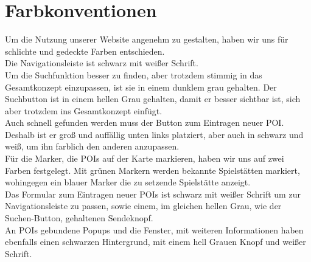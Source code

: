 \chapter{Farbkonventionen}
Um die Nutzung unserer Website angenehm zu gestalten, haben wir uns für schlichte und gedeckte Farben entschieden. \\
Die Navigationsleiste ist schwarz mit weißer Schrift. \\ Um die Suchfunktion besser zu finden, aber trotzdem stimmig in das Gesamtkonzept einzupassen, ist sie in einem dunklem grau gehalten. Der Suchbutton ist in einem hellen Grau gehalten, damit er besser sichtbar ist, sich aber trotzdem ins Gesamtkonzept einfügt.\\
Auch schnell gefunden werden muss der Button zum Eintragen neuer POI. Deshalb ist er groß und auffällig unten links platziert, aber auch in schwarz und weiß, um ihn farblich den anderen anzupassen. \\
Für die Marker, die POIs auf der Karte markieren, haben wir uns auf zwei Farben festgelegt. Mit grünen Markern werden bekannte Spielstätten markiert, wohingegen ein blauer Marker die zu setzende Spielstätte anzeigt. \\
Das Formular zum Eintragen neuer POIs ist schwarz mit weißer Schrift um zur Navigationsleiste zu passen, sowie einem, im gleichen hellen Grau, wie der \glqq Suchen\grqq-Button, gehaltenen Sendeknopf.\\
An POIs gebundene Popups und die Fenster, mit weiteren Informationen haben ebenfalls einen schwarzen Hintergrund, mit einem hell Grauen Knopf und weißer Schrift.\\

